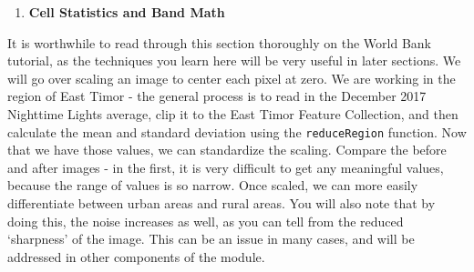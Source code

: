 \documentclass[
]{article}
\providecommand{\tightlist}{%
  \setlength{\itemsep}{0pt}\setlength{\parskip}{0pt}}
\begin{document}
\begin{enumerate}
\def\labelenumi{\arabic{enumi}.}
\setcounter{enumi}{3}
\tightlist
\item
  \textbf{Cell Statistics and Band Math}
\end{enumerate}

It is worthwhile to read through this section thoroughly on the World Bank tutorial, as the techniques you learn here will be very useful in later sections. We will go over scaling an image to center each pixel at zero. We are working in the region of East Timor - the general process is to read in the December 2017 Nighttime Lights average, clip it to the East Timor Feature Collection, and then calculate the mean and standard deviation using the \texttt{reduceRegion} function. Now that we have those values, we can standardize the scaling. Compare the before and after images - in the first, it is very difficult to get any meaningful values, because the range of values is so narrow. Once scaled, we can more easily differentiate between urban areas and rural areas. You will also note that by doing this, the noise increases as well, as you can tell from the reduced `sharpness' of the image. This can be an issue in many cases, and will be addressed in other components of the module.
\end{document}
